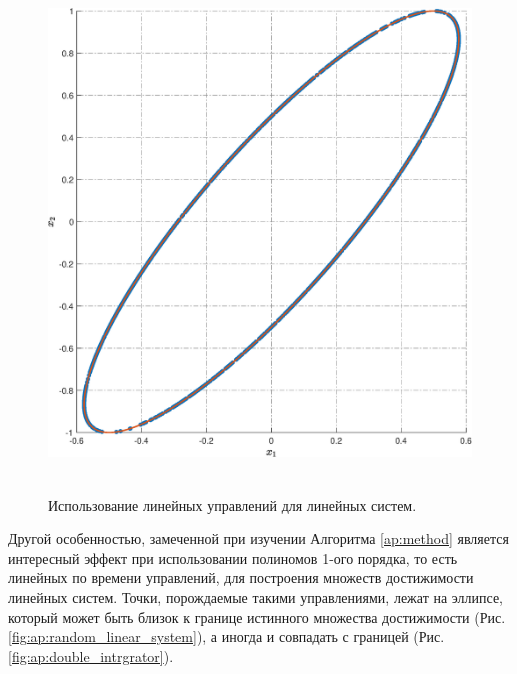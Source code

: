 \documentclass[../main.tex]{subfiles}
\begin{document}
\begin{figure}[ht!]
\begin{minipage}[b]{.4\linewidth}
 		\includegraphics[width=\linewidth]{images/double_integrator_linear_control.eps}
 		 \label{fig:ap:double_intrgrator} 
 	\end{minipage} 
 	\caption{Использование линейных управлений для линейных систем.}\label{fig:ap:linear_control}
 \end{figure}
 
 Другой особенностью, замеченной при изучении Алгоритма \ref{ap:method} является интересный эффект при использовании полиномов 1-ого порядка, то есть линейных по времени управлений, для построения множеств достижимости линейных систем.
 Точки, порождаемые такими управлениями, лежат на эллипсе, который может быть близок к границе истинного множества достижимости (Рис. \ref{fig:ap:random_linear_system}), а иногда и совпадать с границей (Рис. \ref{fig:ap:double_intrgrator}). 
 
\end{document}
